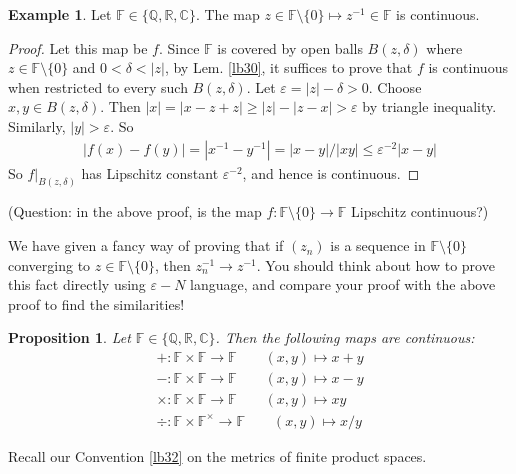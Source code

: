 \documentclass[12pt,b5paper,notitlepage]{article}
\theoremstyle{definition}
\newtheorem{eg}[df]{Example}
\theoremstyle{plain}
\newtheorem{pp}[df]{Proposition}
\newcommand{\Cbb}{\mathbb C}
\newcommand{\Qbb}{\mathbb Q}
\newcommand{\Rbb}{\mathbb R}
\newcommand{\Fbb}{\mathbb F}
\newcommand{\eps}{\varepsilon}
\numberwithin{equation}{section}
\begin{document}
\begin{eg}\label{lb35}
Let $\Fbb\in\{\Qbb,\Rbb,\Cbb\}$. The map $z\in\Fbb\setminus \{0\}\mapsto z^{-1}\in\Fbb$ is continuous.
\end{eg}



\begin{proof}
Let this map be $f$. Since $\Fbb$ is covered by open balls $B(z,\delta)$ where $z\in\Fbb\setminus\{0\}$ and $0<\delta<|z|$, by Lem. \ref{lb30}, it suffices to prove that $f$ is continuous when restricted to every such $B(z,\delta)$. Let $\eps=|z|-\delta>0$. Choose $x,y\in B(z,\delta)$. Then $|x|=|x-z+z|\geq |z|-|z-x|>\eps$ by triangle inequality. Similarly, $|y|>\eps$. So
\begin{align*}
|f(x)-f(y)|=|x^{-1}-y^{-1}|=|x-y|/|xy|\leq \eps^{-2}|x-y|
\end{align*}
So $f|_{B(z,\delta)}$ has Lipschitz constant $\eps^{-2}$, and hence is continuous.
\end{proof}

(Question: in the above proof, is the map $f:\Fbb\setminus\{0\}\rightarrow\Fbb$ Lipschitz continuous?)

We have given a fancy way of proving that  if $(z_n)$ is a sequence in $\Fbb\setminus\{0\}$ converging to $z\in\Fbb\setminus\{0\}$, then $z_n^{-1}\rightarrow z^{-1}$. You should think about how to prove this fact directly using $\eps-N$ language, and compare your proof with the above proof to find the similarities!




\begin{pp}\label{lb41}
Let $\Fbb\in\{\Qbb,\Rbb,\Cbb\}$. Then the following maps are continuous:
\begin{gather*}
+:\Fbb\times\Fbb\rightarrow\Fbb\qquad (x,y)\mapsto x+y\\
-:\Fbb\times\Fbb\rightarrow\Fbb\qquad  (x,y)\mapsto x-y\\
\times: \Fbb\times\Fbb\rightarrow\Fbb\qquad  (x,y)\mapsto xy\\
\div:\Fbb\times\Fbb^\times\rightarrow\Fbb\qquad  (x,y)\mapsto x/y
\end{gather*}
\end{pp}


Recall our Convention \ref{lb32} on the metrics of finite product spaces. 
\end{document}
